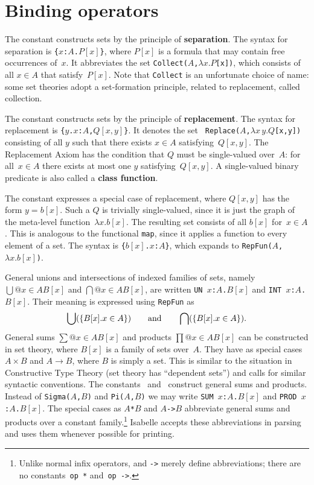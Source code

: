 \section{Binding operators}
The constant  constructs sets by the principle of {\bf
  separation}.  The syntax for separation is \hbox{\tt\{$x$:$A$.$P[x]$\}},
where $P[x]$ is a formula that may contain free occurrences of~$x$.  It
abbreviates the set {\tt Collect($A$,$\lambda x.P$[x])}, which consists of
all $x\in A$ that satisfy~$P[x]$.  Note that {\tt Collect} is an
unfortunate choice of name: some set theories adopt a set-formation
principle, related to replacement, called collection.

The constant  constructs sets by the principle of {\bf
  replacement}.  The syntax for replacement is
\hbox{\tt\{$y$.$x$:$A$,$Q[x,y]$\}}.  It denotes the set {\tt
  Replace($A$,$\lambda x\,y.Q$[x,y])} consisting of all $y$ such that there
exists $x\in A$ satisfying~$Q[x,y]$.  The Replacement Axiom has the
condition that $Q$ must be single-valued over~$A$: for all~$x\in A$ there
exists at most one $y$ satisfying~$Q[x,y]$.  A single-valued binary
predicate is also called a {\bf class function}.

The constant  expresses a special case of replacement,
where $Q[x,y]$ has the form $y=b[x]$.  Such a $Q$ is trivially
single-valued, since it is just the graph of the meta-level
function~$\lambda x.b[x]$.  The resulting set consists of all $b[x]$
for~$x\in A$.  This is analogous to the \ML{} functional {\tt map}, since
it applies a function to every element of a set.  The syntax is
\hbox{\tt\{$b[x]$.$x$:$A$\}}, which expands to {\tt RepFun($A$,$\lambda
  x.b[x]$)}.


General unions and intersections of indexed
families of sets, namely $\bigcup@{x\in A}B[x]$ and $\bigcap@{x\in A}B[x]$,
are written \hbox{\tt UN $x$:$A$.$B[x]$} and \hbox{\tt INT $x$:$A$.$B[x]$}.
Their meaning is expressed using {\tt RepFun} as
\[ \bigcup(\{B[x]. x\in A\}) \qquad\hbox{and}\qquad 
   \bigcap(\{B[x]. x\in A\}). 
\]
General sums $\sum@{x\in A}B[x]$ and products $\prod@{x\in A}B[x]$ can be
constructed in set theory, where $B[x]$ is a family of sets over~$A$.  They
have as special cases $A\times B$ and $A\to B$, where $B$ is simply a set.
This is similar to the situation in Constructive Type Theory (set theory
has ``dependent sets'') and calls for similar syntactic conventions.  The
constants~ and~ construct general sums and
products.  Instead of {\tt Sigma($A$,$B$)} and {\tt Pi($A$,$B$)} we may write
\hbox{\tt SUM $x$:$A$.$B[x]$} and \hbox{\tt PROD $x$:$A$.$B[x]$}.  
%
The special cases as \hbox{\tt$A$*$B$} and \hbox{\tt$A$->$B$} abbreviate
general sums and products over a constant family.\footnote{Unlike normal
infix operators, {\tt*} and {\tt->} merely define abbreviations; there are
no constants~{\tt op~*} and~\hbox{\tt op~->}.} Isabelle accepts these
abbreviations in parsing and uses them whenever possible for printing.

